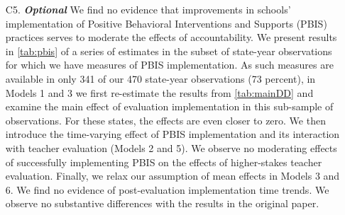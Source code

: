 \documentclass[a4paper, 11pt]{article}
\begin{document}
\begin{enumerate}
	\item[C5.] \textbf{\textit{Optional }} We find no evidence that improvements in schools' implementation of Positive Behavioral Interventions and Supports (PBIS) practices serves to moderate the effects of accountability. We present results in \autoref{tab:pbis} of a series of estimates in the subset of state-year observations for which we have measures of PBIS implementation. As such measures are available in only 341 of our 470 state-year observations (73 percent), in Models 1 and 3 we first re-estimate the results from \autoref{tab:mainDD} and examine the main effect of evaluation implementation in this sub-sample of observations. For these states, the effects are even closer to zero. We then introduce the time-varying effect of PBIS implementation and its interaction with teacher evaluation (Models 2 and 5). We observe no moderating effects of successfully implementing PBIS on the effects of higher-stakes teacher evaluation. Finally, we relax our assumption of mean effects in Models 3 and 6. We find no evidence of post-evaluation implementation time trends. We observe no substantive differences with the results in the original paper.


\end{enumerate}



\end{document}
